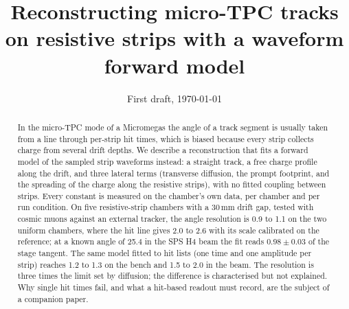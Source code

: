 \documentclass[11pt,a4paper]{article}
\title{Reconstructing micro-TPC tracks on resistive strips with a waveform forward model}
\author{\tbw{author list -- undecided (C4)}}
\date{First draft, \today}
\begin{document}
\maketitle

\begin{abstract}
In the micro-TPC mode of a Micromegas the angle of a track segment is usually taken from a line through per-strip hit
times, which is biased because every strip collects charge from several drift depths. We describe a reconstruction
that fits a forward model of the sampled strip waveforms instead: a straight track, a free charge profile along the
drift, and three lateral terms (transverse diffusion, the prompt footprint, and the spreading of the charge along the
resistive strips), with no fitted coupling between strips. Every constant is measured on the chamber's own data, per
chamber and per run condition. On five resistive-strip chambers with a 30\,mm drift gap, tested with cosmic muons against
an external tracker, the angle resolution is 0.9 to 1.1\textdegree{} on the two uniform chambers, where the hit line
gives 2.0 to 2.6\textdegree{} with its scale calibrated on the reference; at a known angle of 25.4\textdegree{} in the
SPS H4 beam the fit reads $0.98\pm0.03$ of the stage tangent. The same model fitted to hit lists (one time and one
amplitude per strip) reaches 1.2 to 1.3\textdegree{} on the bench and 1.5 to 2.0\textdegree{} in the beam. The
resolution is three times the limit set by diffusion; the difference is characterised but not explained. Why single
hit times fail, and what a hit-based readout must record, are the subject of a companion paper.
\end{abstract}

\ifdraftnotes
{}
\clearpage
\fi












\end{document}

